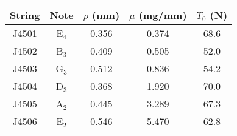 \begin{tabular}{ccccc}
\toprule
String & Note & $\rho$ (mm) & $\mu$ (mg/mm) & $T_0$ (N) \\
\midrule
J4501 & E$_{4}$ & 0.356 & 0.374 & 68.6 \\
J4502 & B$_{3}$ & 0.409 & 0.505 & 52.0 \\
J4503 & G$_{3}$ & 0.512 & 0.836 & 54.2 \\
J4504 & D$_{3}$ & 0.368 & 1.920 & 70.0 \\
J4505 & A$_{2}$ & 0.445 & 3.289 & 67.3 \\
J4506 & E$_{2}$ & 0.546 & 5.470 & 62.8 \\
\bottomrule
\end{tabular}

